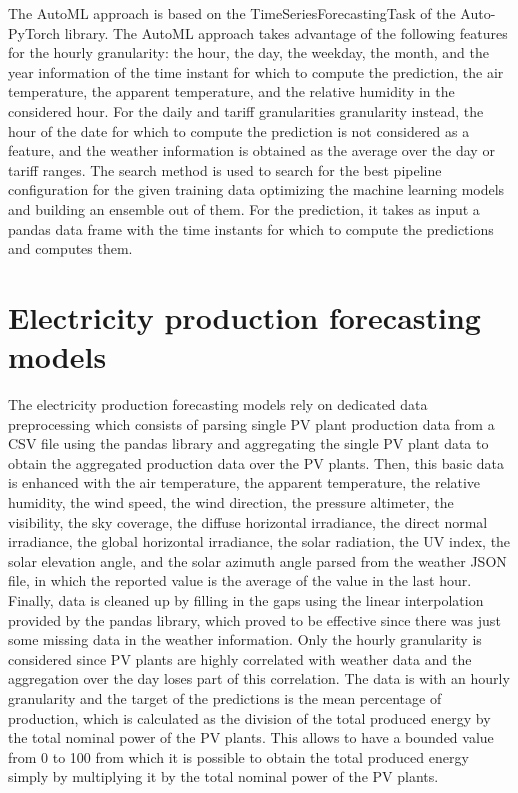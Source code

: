 The AutoML approach is based on the TimeSeriesForecastingTask of the Auto-PyTorch library.
The AutoML approach takes advantage of the following features for the hourly granularity: the hour, the day, the weekday, the month, and the year information of the time instant for which to compute the prediction, the air temperature, the apparent temperature, and the relative humidity in the considered hour.
For the daily and tariff granularities granularity instead, the hour of the date for which to compute the prediction is not considered as a feature, and the weather information is obtained as the average over the day or tariff ranges.
The search method is used to search for the best pipeline configuration for the given training data optimizing the machine learning models and building an ensemble out of them.
For the prediction, it takes as input a pandas data frame with the time instants for which to compute the predictions and computes them.


\section{Electricity production forecasting models}
\label{sec:productionimpl}
\vspace{0.2 cm}

The electricity production forecasting models rely on dedicated data preprocessing which consists of parsing single PV plant production data from a CSV file using the pandas library and aggregating the single PV plant data to obtain the aggregated production data over the PV plants.
Then, this basic data is enhanced with the air temperature, the apparent temperature, the relative humidity, the wind speed, the wind direction, the pressure altimeter, the visibility, the sky coverage, the diffuse horizontal irradiance, the direct normal irradiance, the global horizontal irradiance, the solar radiation, the UV index, the solar elevation angle, and the solar azimuth angle parsed from the weather JSON file, in which the reported value is the average of the value in the last hour.
Finally, data is cleaned up by filling in the gaps using the linear interpolation provided by the pandas library, which proved to be effective since there was just some missing data in the weather information.
Only the hourly granularity is considered since PV plants are highly correlated with weather data and the aggregation over the day loses part of this correlation.
The data is with an hourly granularity and the target of the predictions is the mean percentage of production, which is calculated as the division of the total produced energy by the total nominal power of the PV plants.
This allows to have a bounded value from 0 to 100 from which it is possible to obtain the total produced energy simply by multiplying it by the total nominal power of the PV plants.

